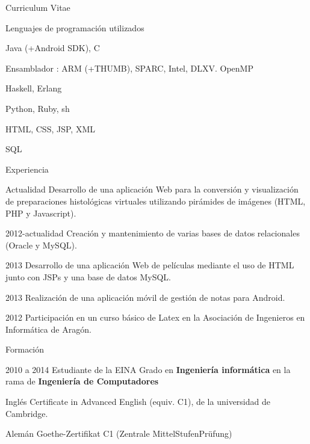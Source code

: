 \begin{cv}{Curriculum Vitae}

\begin{cvlist}{Lenguajes de programación utilizados}
\item Java (+Android SDK), C
\item Ensamblador : ARM (+THUMB), SPARC, Intel, DLXV. OpenMP
\item Haskell, Erlang
\item Python, Ruby, sh
\item HTML, CSS, JSP, XML
\item SQL
\end{cvlist}

\begin{cvlist}{Experiencia}
	\item[Actualidad] Desarrollo de una aplicación Web para la conversión y 
	visualización de preparaciones histológicas virtuales utilizando pirámides 
	de imágenes (HTML, PHP y Javascript).

	\item[2012-actualidad] Creación y mantenimiento de varias bases de datos
	relacionales (Oracle y MySQL).
	
	\item[2013] Desarrollo de una aplicación Web de películas mediante el uso
	de HTML junto con JSPs y una base de datos MySQL.
	
	\item[2013] Realización de una aplicación móvil de gestión de notas para Android.

	\item[2012] Participación en un curso básico de Latex en la Asociación de Ingenieros 
	en Informática de Aragón.
	
\end{cvlist}

\begin{cvlist}{Formación}

	\item[2010 a 2014] Estudiante de la EINA
		Grado en \textbf{Ingeniería informática} en la rama de \textbf{Ingeniería de Computadores}\\
	\item[Inglés] Certificate in Advanced English (equiv. C1), de la universidad de Cambridge.
	\item[Alemán] Goethe-Zertifikat C1 (Zentrale MittelStufenPrüfung)
\end{cvlist}

\end{cv}